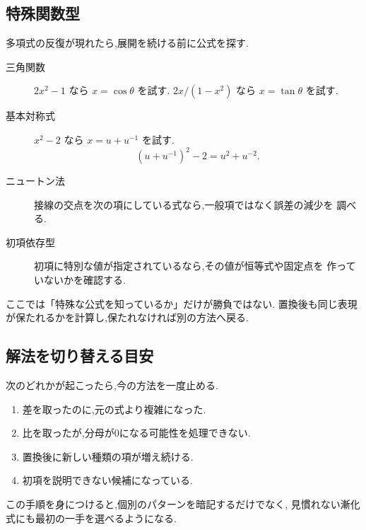 \subsection{特殊関数型}

多項式の反復が現れたら,展開を続ける前に公式を探す.

\begin{description}
  \item[三角関数]
    $2x^2-1$ なら $x=\cos\theta$ を試す.
    $2x/(1-x^2)$ なら $x=\tan\theta$ を試す.
  \item[基本対称式]
    $x^2-2$ なら $x=u+u^{-1}$ を試す.
    \[
      (u+u^{-1})^2-2=u^2+u^{-2}.
    \]
  \item[ニュートン法]
    接線の交点を次の項にしている式なら,一般項ではなく誤差の減少を
    調べる.
  \item[初項依存型]
    初項に特別な値が指定されているなら,その値が恒等式や固定点を
    作っていないかを確認する.
\end{description}

ここでは「特殊な公式を知っているか」だけが勝負ではない.
置換後も同じ表現が保たれるかを計算し,保たれなければ別の方法へ戻る.

\subsection{解法を切り替える目安}

次のどれかが起こったら,今の方法を一度止める.

\begin{enumerate}
  \item 差を取ったのに,元の式より複雑になった.
  \item 比を取ったが,分母が0になる可能性を処理できない.
  \item 置換後に新しい種類の項が増え続ける.
  \item 初項を説明できない候補になっている.
\end{enumerate}

この手順を身につけると,個別のパターンを暗記するだけでなく,
見慣れない漸化式にも最初の一手を選べるようになる.

